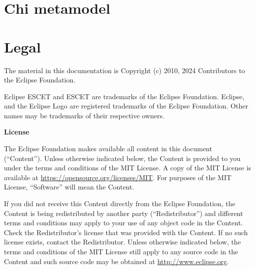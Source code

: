 \documentclass{report}
\begin{document}
\chapter{Chi metamodel}





\chapter{Legal}

The material in this documentation is
Copyright (c) 2010, 2024 Contributors to the Eclipse Foundation.

Eclipse ESCET and ESCET are trademarks of the Eclipse Foundation.
Eclipse, and the Eclipse Logo are registered trademarks of the
Eclipse Foundation. Other names may be trademarks of their
respective owners.

\textbf{License}

The Eclipse Foundation makes available all content in this document
(``Content''). Unless otherwise indicated below, the Content is provided to you
under the terms and conditions of the MIT License. A copy of the MIT License
is available at \url{https://opensource.org/licenses/MIT}. For purposes of the
MIT License, ``Software'' will mean the Content.

If you did not receive this Content directly from the Eclipse Foundation,
the Content is being redistributed by another party (``Redistributor'') and
different terms and conditions may apply to your use of any object code in
the Content. Check the Redistributor's license that was provided with the
Content. If no such license exists, contact the Redistributor. Unless
otherwise indicated below, the terms and conditions of the MIT License
still apply to any source code in the Content and such source code may be
obtained at \url{http://www.eclipse.org}.





\end{document}
